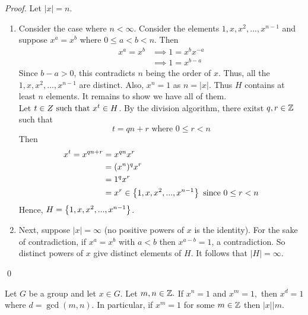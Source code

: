 \begin{proof}
    Let $|x| = n$.
    \begin{enumerate}
        \item Consider the case where $n < \infty$. Consider the elements $1, x, x^2, ..., x^{n-1}$ and suppose $x^a = x^b$ where $0 \leq a < b < n$. Then 
        \begin{align*}
            x^a = x^b &\implies 1 = x^bx^{-a} \\
            &\implies 1 = x^{b-a}
        \end{align*}
        Since $b-a > 0$, this contradicts $n$ being the order of $x$. Thus, all the $1, x, x^2, ..., x^{n-1}$ are distinct. Also, $x^n = 1$ as $n = |x|$. Thus $H$ contains at least $n$ elements. It remains to show we have all of them. \\
        Let $t \in Z \text{ such that } x^t \in H$. By the division algorithm, there exitst $q, r \in \mathbb{Z}$ such that 
        $$t = qn + r \text{ where } 0 \leq r < n$$
        Then
        \begin{align*}
            x^t = x^{qn+r} &= x^{qn}x^r \\
            &= (x^n)^qx^r \\
            &= 1^q x^r \\
            &=x^r \in \left\{1, x, x^2, ..., x^{n-1}\right\} \text{ since } 0 \leq r < n
        \end{align*}
        Hence, $H = \left\{1, x, x^2, ..., x^{n-1}\right\}$.

        \item Next, suppose $|x| =\infty$ (no positive powers of $x$ is the identity). For the sake of contradiction, if $x^a=x^b$ with $a < b$ then $x^{a-b}=1$, a contradiction. So distinct powers of $x$ give distinct elements of $H$. It follows that $|H| =\infty$.
    \end{enumerate}
    \qed
\end{proof}

\begin{proposition}
    Let $G$ be a group and let $x \in G$. Let $m,n \in \mathbb{Z}.$ If $x^n = 1$ and $x^m = 1,$ then $x^d = 1$ where $d = \gcd (m,n).$ In particular, if $x^m = 1$ for some $m \in \mathbb{Z}$ then $|x| | m$.
\end{proposition}

